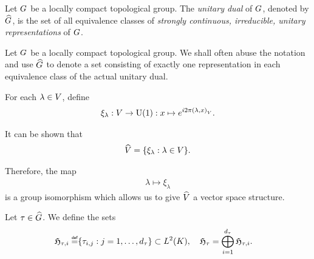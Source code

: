 \begin{definition}
\label{definition:unitary_dual}
    Let $G$ be a locally compact topological group.
    The \emph{unitary dual} of $G$, denoted by ${\widehat{G}}$,
    is the set of all equivalence classes of
    \emph{strongly continuous, irreducible, unitary representations} of $G$.
\end{definition}

\begin{remark}
    Let $G$ be a locally compact topological group.
    We shall often abuse the notation and use ${\widehat{G}}$ to denote a set consisting of
    exactly one representation in each equivalence class of the actual unitary dual.
\end{remark}

\begin{example}[$\dualGroup\VectorSpace$]
    For each $\lambda \in V$,
    define
    \begin{align}
        \xi_\lambda : V \to {\mathrm{U} (1)} : x \mapsto e^{i 2 \pi {\left(\lambda, x\right)_{V}}}.
        \label{eq:elements_of_dual_of_vector_space}
    \end{align}

    It can be shown that
    \begin{align*}
        {\widehat{V}} = \{ \xi_\lambda : \lambda \in V \}.
    \end{align*}

    Therefore, the map
    \begin{align}
        \lambda \mapsto \xi_\lambda
        \label{eq:isomorphism_between_vector_space_and_its_dual_group}
    \end{align}
    is a group isomorphism which allows us to give $\dualGroup\VectorSpace$ a vector space structure.
\end{example}

\begin{definition}
    Let $\tau \in {\widehat{G}}$.
    We define the sets
    \begin{align*}
        \HilbertCompactGroupColumn{\tau}{i} \defeq \span \{ \tau_{i, j} : j = 1, \dots, \dimRep\tau \}
        \subset \Lebesgue{2}\CompactGroup, \quad
        \HilbertCompactGroup{\tau} = \bigoplus_{i = 1}^\dimRep\tau \HilbertCompactGroupColumn{\tau}{i}.
    \end{align*}
\end{definition}

